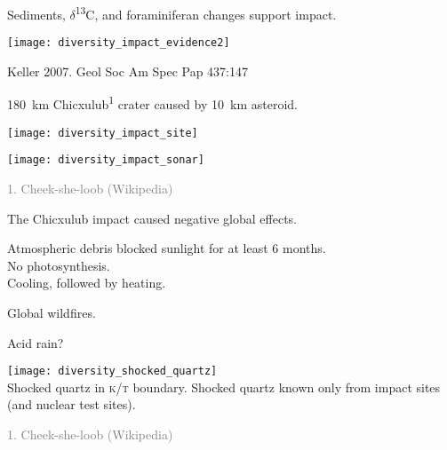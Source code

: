 \documentclass[t]{beamer}
\newcommand{\backskip}{\vspace{-0.5\baselineskip}}
\begin{document}


\begin{frame}{Sediments, $\delta$\textsuperscript{13}C, and foraminiferan changes support impact.}


\centering

\texttt{[image: diversity\_impact\_evidence2]}
	
\tinyfill Keller 2007. Geol Soc Am Spec Pap 437:147

\end{frame}




\begin{frame}{180~km Chicxulub\textsuperscript{1} crater caused by 10~km asteroid.}

\backskip

\begin{multicols}{2}

\texttt{[image: diversity\_impact\_site]}

\columnbreak

\texttt{[image: diversity\_impact\_sonar]}
\end{multicols}

\centering

\vfilll
	
\tiny \textcolor{gray}{1. Cheek-she-loob (Wikipedia)}


\end{frame}


\begin{frame}{The Chicxulub impact caused negative global effects.}

\backskip

\begin{multicols}{2}

\hangpara Atmospheric debris blocked sunlight for at least 6 months.
\\
\hspace*{1em} No photosynthesis.
\\
\hspace*{1em} Cooling, followed by heating.

\hangpara Global wildfires.

\hangpara Acid rain?

\columnbreak

\noindent \texttt{[image: diversity\_shocked\_quartz]}\\
\noindent Shocked quartz in \textsc{k/t} boundary. Shocked quartz known only from impact sites (and nuclear test sites).


\end{multicols}

\vfilll
	
\tiny \textcolor{gray}{1. Cheek-she-loob (Wikipedia)}

\end{frame}
\end{document}

